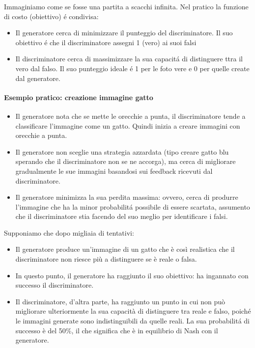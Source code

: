 Immaginiamo come se fosse una partita a scacchi infinita. Nel pratico la funzione di costo (obiettivo) é condivisa: 
\begin{itemize}
    \item Il generatore cerca di minimizzare il punteggio del discriminatore. Il suo obiettivo é che il discriminatore assegni 1 (vero) ai suoi falsi
    \item Il discriminatore cerca di massimizzare la sua capacitá di distinguere ttra il vero dal falso. Il suo punteggio ideale é 1 per le foto vere e 0 per quelle create dal generatore.
\end{itemize}

\paragraph{Esempio pratico: creazione immagine gatto}
\begin{itemize}
    \item Il generatore nota che se mette le orecchie a punta, il discriminatore tende a classificare l'immagine come un gatto. Quindi inizia a creare immagini con orecchie a punta.
    \item Il generatore non sceglie una strategia azzardata (tipo creare gatto blu sperando che il discriminatore non se ne accorga), ma cerca di migliorare gradualmente le sue immagini basandosi sui feedback ricevuti dal discriminatore.
    \item Il generatore minimizza la sua perdita massima: ovvero, cerca di produrre l'immagine che ha la minor probabilitá possibile di essere scartata, assumento che il discriminatore stia facendo del suo meglio per identificare i falsi.
\end{itemize}

Supponiamo che dopo migliaia di tentativi:
\begin{itemize}
    \item Il generatore produce un'immagine di un gatto che è così realistica che il discriminatore non riesce più a distinguere se è reale o falsa.
    \item In questo punto, il generatore ha raggiunto il suo obiettivo: ha ingannato con successo il discriminatore.
    \item Il discriminatore, d'altra parte, ha raggiunto un punto in cui non può migliorare ulteriormente la sua capacità di distinguere tra reale e falso, poiché le immagini generate sono indistinguibili da quelle reali. La sua probabilitá di successo è del 50\%, il che significa che è in equilibrio di Nash con il generatore.
\end{itemize}

